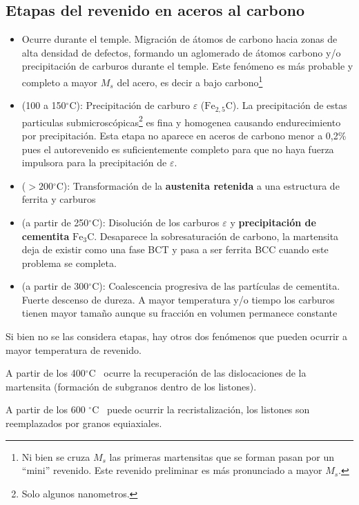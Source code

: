 \documentclass{article}
\newcommand{\grad}{\ensuremath{^\circ \mathrm{C}}}
\newcommand{\cementita}{\ensuremath{\mathrm{Fe}_3 \mathrm{C}}}
\begin{document}
\subsection{Etapas del revenido en aceros al carbono}

\begin{itemize}
    \item[Autorevenido] Ocurre durante el temple. Migración de átomos de carbono hacia zonas de alta densidad de defectos, formando un aglomerado de átomos carbono y/o precipitación de carburos durante el temple. Este fenómeno es más probable y completo a mayor $M_s$ del acero, es decir a bajo carbono\footnote{Ni bien se cruza $M_s$ las primeras martensitas que se forman pasan por un ``mini'' revenido. Este revenido preliminar es más pronunciado a mayor $M_s$.}
    \item[Etapa 1] (100 a 150\grad): Precipitación de carburo $\varepsilon$ ($\mathrm{Fe}_{2,5}\mathrm{C}$). La precipitación de estas particulas submicroscópicas\footnote{Solo algunos nanometros.} es fina y homogenea causando endurecimiento por precipitación. Esta etapa no aparece en aceros de carbono menor a 0,2\% pues el autorevenido es suficientemente completo para que no haya fuerza impulsora para la precipitación de $\varepsilon$.
    \item[Etapa 2] ($>200\grad$): Transformación de la\textbf{ austenita retenida} a una estructura de ferrita y carburos
    \item [Etapa 3] (a partir de 250\grad): Disolución de los carburos $\varepsilon$ y \textbf{precipitación de cementita} \cementita. Desaparece la sobresaturación de carbono, la martensita deja de existir como una fase BCT y pasa a ser ferrita BCC cuando este problema se completa.
    \item[Etapa 4] (a partir de 300\grad): Coalescencia progresiva de las partículas de cementita. Fuerte descenso de dureza. A mayor temperatura y/o tiempo los carburos tienen mayor tamaño aunque su fracción en volumen permanece constante
\end{itemize}

Si bien no se las considera etapas, hay otros dos fenómenos que pueden
ocurrir a mayor temperatura de revenido.

A partir de los 400\grad~ ocurre la recuperación de las dislocaciones de la
martensita (formación de subgranos dentro de los listones).


A partir de los 600 \grad~ puede ocurrir la recristalización, los listones son
reemplazados por granos equiaxiales.
\end{document}
